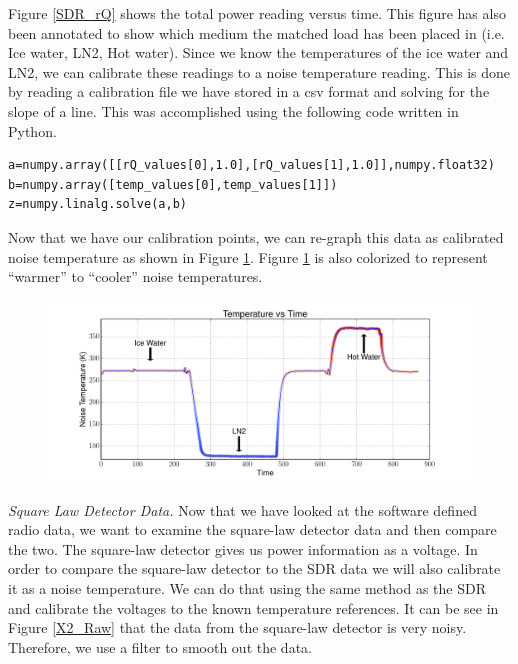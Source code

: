 {Figure \ref{SDR_rQ} shows the total power reading versus time.  This figure has also been annotated to show which medium the matched load has been placed in (i.e. Ice water, LN2, Hot water).  Since we know the temperatures of the ice water and LN2, we can calibrate these readings to a noise temperature reading.  This is done by reading a calibration file we have stored in a csv format and solving for the slope of a line.  This was accomplished using the following code written in Python.

\lstset{language=Python}
\begin{lstlisting}[frame=single,keywordstyle=\color{blue}]
a=numpy.array([[rQ_values[0],1.0],[rQ_values[1],1.0]],numpy.float32)
b=numpy.array([temp_values[0],temp_values[1]])
z=numpy.linalg.solve(a,b)
\end{lstlisting}

Now that we have our calibration points, we can re-graph this data as calibrated noise temperature as shown in Figure \ref{SDR_Calibrated}.  Figure \ref{SDR_Calibrated} is also colorized to represent ``warmer'' to ``cooler'' noise temperatures.

\begin{figure}[h!tb] \centering

\includegraphics[width=\textwidth]{Experiments/Exp1/sdr_calibrated_color.pdf}

\label{SDR_Calibrated}
\end{figure}

\emph{Square Law Detector Data.}  Now that we have looked at the software defined radio data, we want to examine the square-law detector data and then compare the two.  The square-law detector gives us power information as a voltage.  In order to compare the square-law detector to the SDR data we will also calibrate it as a noise temperature.  We can do that using the same method as the SDR and calibrate the voltages to the known temperature references.  It can be see in Figure \ref{X2_Raw} that the data from the square-law detector is very noisy.  Therefore, we use a filter to smooth out the data.

}
